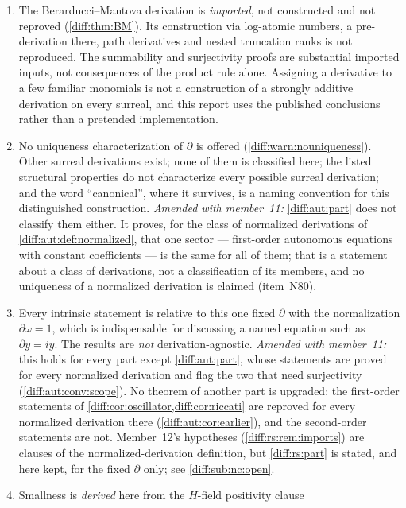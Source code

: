 \documentclass[11pt,letterpaper]{article}
\numberwithin{equation}{section}
\theoremstyle{definition}
\theoremstyle{remark}
\newcommand{\der}{\partial}
\begin{document}
\begin{enumerate}[label=\textup{N\arabic*.},leftmargin=3.0em,itemsep=0.35em]
\item The Berarducci--Mantova derivation is \emph{imported}, not constructed
and not reproved (\cref{diff:thm:BM}). Its construction via log-atomic
numbers, a pre-derivation there, path derivatives and nested truncation ranks
is not reproduced. The summability and surjectivity proofs are substantial
imported inputs, not consequences of the product rule alone. Assigning a
derivative to a few familiar monomials is not a construction of a strongly
additive derivation on every surreal, and this report uses the published
conclusions rather than a pretended implementation.
\item No uniqueness characterization of $\der$ is offered
(\cref{diff:warn:nouniqueness}). Other surreal derivations exist; none of them
is classified here; the listed structural properties do not characterize every
possible surreal derivation; and the word ``canonical'', where it survives, is
a naming convention for this distinguished construction. \emph{Amended with
member~11:} \cref{diff:aut:part} does not classify them either. It proves, for
the class of normalized derivations of \cref{diff:aut:def:normalized}, that one
sector --- first-order autonomous equations with constant coefficients --- is
the same for all of them; that is a statement about a class of derivations, not
a classification of its members, and no uniqueness of a normalized derivation
is claimed (item~N80).
\item Every intrinsic statement is relative to this one fixed $\der$ with the
normalization $\der\omega=1$, which is indispensable for discussing a named
equation such as $\der y=iy$. The results are \emph{not} derivation-agnostic.
\emph{Amended with member~11:} this holds for every part except
\cref{diff:aut:part}, whose statements are proved for every normalized
derivation and flag the two that need surjectivity
(\cref{diff:aut:conv:scope}). No theorem of another part is upgraded; the
first-order statements of \cref{diff:cor:oscillator,diff:cor:riccati} are
reproved for every normalized derivation there (\cref{diff:aut:cor:earlier}),
and the second-order statements are not. Member~12's hypotheses
(\cref{diff:rs:rem:imports}) are clauses of the normalized-derivation
definition, but \cref{diff:rs:part} is stated, and here kept, for the fixed
$\der$ only; see \cref{diff:sub:nc:open}.
\item Smallness is \emph{derived} here from the $H$-field positivity clause

\end{enumerate}
\end{document}

